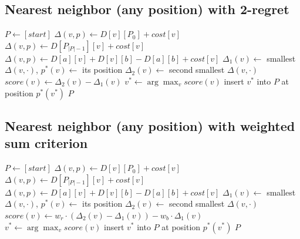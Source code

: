 \documentclass[11pt,a4paper]{article}
\begin{document}
\subsection*{Nearest neighbor (any position) with 2-regret}
\begin{algorithm}[H]
\caption{Nearest neighbor (any position) with 2-regret}
\begin{algorithmic}[1]
  \State $P \gets [\mathit{start}]$
         
          \State $\Delta(v, p) \gets D[v][P_0] + \mathit{cost}[v]$
         
          \State $\Delta(v, p) \gets D[P_{|P|-1}][v] + \mathit{cost}[v]$
        \Else {}
          \State $\Delta(v, p) \gets D[a][v] + D[v][b] - D[a][b] + \mathit{cost}[v]$
        \EndIf
      \EndFor
      \State $\Delta_1(v) \gets$ smallest $\Delta(v, \cdot)$, $p^*(v) \gets$ its position
      \State $\Delta_2(v) \gets$ second smallest $\Delta(v, \cdot)$
      \State $\mathit{score}(v) \gets \Delta_2(v) - \Delta_1(v)$
    \EndFor
    \State $v^* \gets \arg\max_v \mathit{score}(v)$ 
    \State insert $v^*$ into $P$ at position $p^*(v^*)$
  \EndWhile
  \State \Return $P$
\EndFunction
\end{algorithmic}
\end{algorithm}

\subsection*{Nearest neighbor (any position) with weighted sum criterion}
\begin{algorithm}[H]
\caption{Nearest neighbor (any position) with 2-regret + best change}
\begin{algorithmic}[1]
  \State $P \gets [\mathit{start}]$
         
          \State $\Delta(v, p) \gets D[v][P_0] + \mathit{cost}[v]$
         
          \State $\Delta(v, p) \gets D[P_{|P|-1}][v] + \mathit{cost}[v]$
        \Else {}
          \State $\Delta(v, p) \gets D[a][v] + D[v][b] - D[a][b] + \mathit{cost}[v]$
        \EndIf
      \EndFor
      \State $\Delta_1(v) \gets$ smallest $\Delta(v, \cdot)$, $p^*(v) \gets$ its position
      \State $\Delta_2(v) \gets$ second smallest $\Delta(v, \cdot)$
      \State $\mathit{score}(v) \gets w_r \cdot (\Delta_2(v) - \Delta_1(v)) - w_b \cdot \Delta_1(v)$
    \EndFor
    \State $v^* \gets \arg\max_v \mathit{score}(v)$ 
    \State insert $v^*$ into $P$ at position $p^*(v^*)$
  \EndWhile
  \State \Return $P$
\EndFunction
\end{algorithmic}
\end{algorithm}
\end{document}
